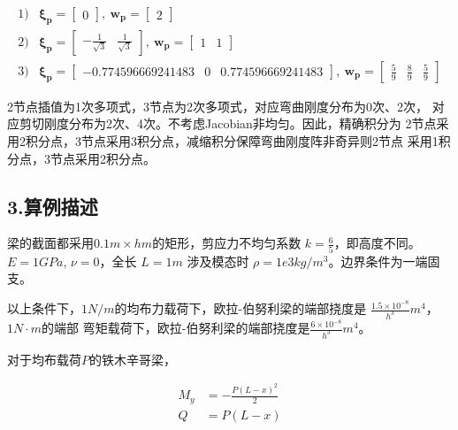 \documentclass[UTF8,c5size]{ctexart}
\begin{document}
\begin{equation}
    \begin{split}
        1) & \bm{\xi_p}=\begin{bmatrix}
            0
        \end{bmatrix}, \ 
        \bm{w_p}=\begin{bmatrix}
            2
        \end{bmatrix}
        \\ 2) & \bm{\xi_p}=\begin{bmatrix}
            -\frac{1}{\sqrt{3}}&\frac{1}{\sqrt{3}}
        \end{bmatrix}, \ 
        \bm{w_p}=\begin{bmatrix}
            1&1
        \end{bmatrix}
        \\ 3) & \bm{\xi_p}=\begin{bmatrix}
            -0.774596669241483&0&0.774596669241483
        \end{bmatrix}, \ 
        \bm{w_p}=\begin{bmatrix}
            \frac{5}{9}&\frac{8}{9}&\frac{5}{9}
        \end{bmatrix}
    \end{split}
\end{equation}

2节点插值为1次多项式，3节点为2次多项式，对应弯曲刚度分布为0次、2次，
对应剪切刚度分布为2次、4次。不考虑Jacobian非均匀。因此，精确积分为
2节点采用2积分点，3节点采用3积分点，减缩积分保障弯曲刚度阵非奇异则2节点
采用1积分点，3节点采用2积分点。

\subsection*{3.算例描述}

梁的截面都采用$0.1m\times hm$的矩形，剪应力不均匀系数
$k=\frac{6}{5}$，即高度不同。$E=1GPa$, $\nu = 0$，全长
$L=1m$
涉及模态时
$\rho=1e3kg/m^3$。边界条件为一端固支。

以上条件下，$1N/m$的均布力载荷下，欧拉-伯努利梁的端部挠度是
$\frac{1.5\times10^{-8}}{h^3}m^4$，$1N\cdot m$的端部
弯矩载荷下，欧拉-伯努利梁的端部挠度是$\frac{6\times10^{-8}}{h^3}m^4$。

对于均布载荷$P$的铁木辛哥梁，

\begin{equation}
    \begin{split}
        M_y&=-\frac{P(L-x)^2}{2}\\
        Q&=P(L-x)
    \end{split}
\end{equation}
\end{document}
